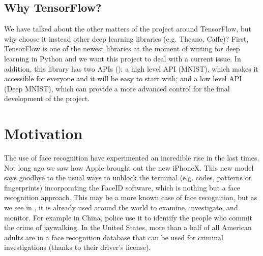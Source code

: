 	\subsection{Why TensorFlow?}
	We have talked about the other matters of the project around TensorFlow, but why choose it instead other deep learning libraries (e.g. Theano, Caffe)? First, TensorFlow is one of the newest libraries at the moment of writing for deep learning in Python and we want this project to deal with a current issue. In addition, this library has two APIs (\cite{tensorflow_main_website}): a high level API (MNIST), which makes it accessible for everyone and it will be easy to start with; and a low level API (Deep MNIST), which can provide a more advanced control for the final development of the project.



\section{Motivation}
The use of face recognition have experimented an incredible rise in the last times. Not long ago we saw how Apple brought out the new iPhoneX. This new model says goodbye to the usual ways to unblock the terminal (e.g. codes, patterns or fingerprints) incorporating the FaceID software, which is nothing but a face recognition approach. This may be a more known case of face recognition, but as we see in \cite{iphonex_and_other_uses}, it is already used around the world to examine, investigate, and monitor. For example in China, police use it to identify the people who commit the crime of jaywalking. In the United States, more than a half of all American adults are in a face recognition database that can be used for criminal investigations (thanks to their driver’s license).





